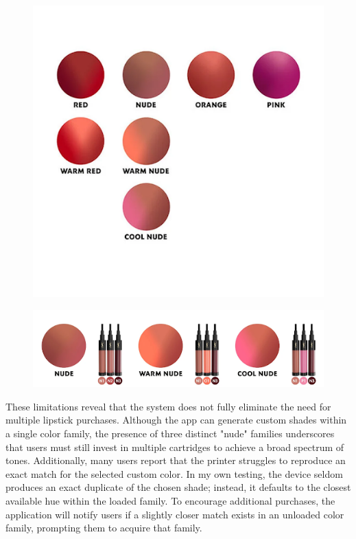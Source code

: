 \begin{figure}[H]
	\centering
	\includegraphics[scale=.5]{colorfamilies}
	\caption{}
	\label{fig:colorfamilies}
\end{figure}

\begin{figure}[H]
	\centering
	\includegraphics[scale=.5]{cartridges}
	\caption{}
	\label{fig:cartridges}
\end{figure}


These limitations reveal that the system does not fully eliminate the need for multiple lipstick purchases. Although the app can generate custom shades within a single color family, the presence of three distinct "nude" families underscores that users must still invest in multiple cartridges to achieve a broad spectrum of tones. Additionally, many users report that the printer struggles to reproduce an exact match for the selected custom color. In my own testing, the device seldom produces an exact duplicate of the chosen shade; instead, it defaults to the closest available hue within the loaded family. To encourage additional purchases, the application will notify users if a slightly closer match exists in an unloaded color family, prompting them to acquire that family.


